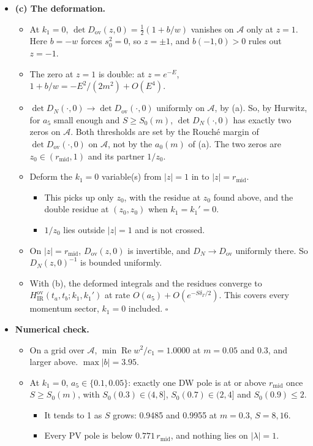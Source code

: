 \documentclass[11pt,a4paper]{article}
\begin{document}
\begin{itemize}
\begin{itemize}
\item{} {\bfseries\boldmath (c) The deformation.}
\begin{itemize}
\item{} At $k_1 = 0$, $\det D_{\text{ov}}(z, 0) = \frac{1}{2}(1 + b/w)$ vanishes on $\mathcal{A}$ only at $z = 1$. Here $b = -w$ forces $s_0^2 = 0$, so $z = \pm 1$, and $b(-1, 0) > 0$ rules out $z = -1$.
\item{} The zero at $z = 1$ is double: at $z = e^{-E}$, $1 + b/w = -E^2/(2m^2) + O(E^4)$.
\item{} $\det D_N(\cdot, 0) \to \det D_{\text{ov}}(\cdot, 0)$ uniformly on $\mathcal{A}$, by (a). So, by Hurwitz, for $a_5$ small enough and $S \ge S_0(m)$, $\det D_N(\cdot, 0)$ has exactly two zeros on $\mathcal{A}$. Both thresholds are set by the Rouch\'e margin of $\det D_{\text{ov}}(\cdot, 0)$ on $\mathcal{A}$, not by the $a_0(m)$ of (a). The two zeros are $z_0 \in (r_{\text{mid}}, 1)$ and its partner $1/z_0$.
\item{} Deform the $k_1 = 0$ variable(s) from $|z| = 1$ in to $|z| = r_{\text{mid}}$.
\begin{itemize}
\item{} This picks up only $z_0$, with the residue at $z_0$ found above, and the double residue at $(z_0, z_0)$ when $k_1 = k_1' = 0$.
\item{} $1/z_0$ lies outside $|z| = 1$ and is not crossed.
\end{itemize}

\item{} On $|z| = r_{\text{mid}}$, $D_{\text{ov}}(z, 0)$ is invertible, and $D_N \to D_{\text{ov}}$ uniformly there. So $D_N(z, 0)^{-1}$ is bounded uniformly.
\item{} With (b), the deformed integrals and the residues converge to $H^{\text{ov}}_{\text{IR}}(t_a, t_b; k_1, k_1')$ at rate $O(a_5) + O(e^{-S\delta_\Gamma/2})$. This covers every momentum sector, $k_1 = 0$ included. $\square$
\end{itemize}

\item{} {\bfseries\boldmath Numerical check.}
\begin{itemize}
\item{} On a grid over $\mathcal{A}$, $\min\operatorname{Re} w^2/c_1 = 1.0000$ at $m = 0.05$ and $0.3$, and larger above. $\max|b| = 3.95$.
\item{} At $k_1 = 0$, $a_5 \in \{0.1, 0.05\}$: exactly one DW pole is at or above $r_{\text{mid}}$ once $S \ge S_0(m)$, with $S_0(0.3) \in (4, 8]$, $S_0(0.7) \in (2, 4]$ and $S_0(0.9) \le 2$.
\begin{itemize}
\item{} It tends to 1 as $S$ grows: 0.9485 and 0.9955 at $m = 0.3$, $S = 8, 16$.
\item{} Every PV pole is below $0.771\, r_{\text{mid}}$, and nothing lies on $|\lambda| = 1$.
\end{itemize}

\end{itemize}

\end{itemize}

\end{itemize}
\end{document}
